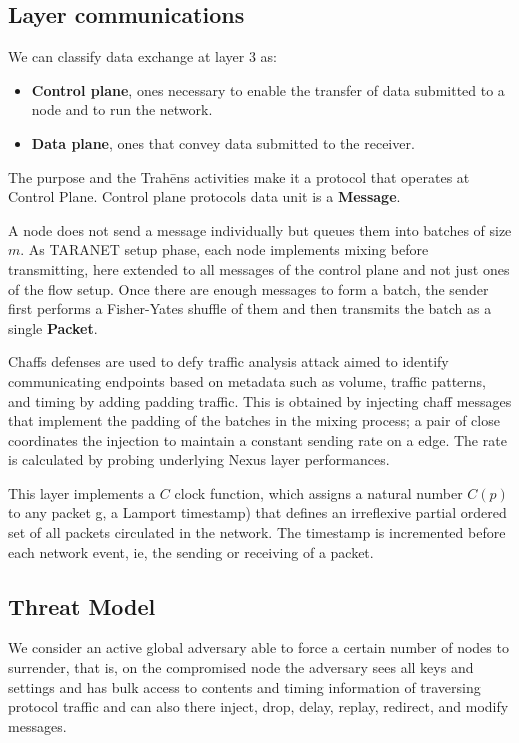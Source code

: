 \documentclass[12pt,oneside]{wlscirep}
\newcommand{\ProtoName}{Trah\={e}ns }
\begin{document}
\subsection{Layer communications}
We can classify data exchange at layer 3 as: 
\begin{itemize}
\item \textbf{Control plane}, ones necessary to enable the transfer of data submitted to a node and to run the network.
\item \textbf{Data plane}, ones that convey data submitted to the receiver. 
\end{itemize}\par
The purpose and the \ProtoName activities make it a protocol that operates at Control Plane. Control plane protocols data unit is a \textbf{Message}. \par
A node does not send a message individually but queues them into batches of size $m$. As TARANET\cite{chen_taranet:_2018} setup phase, each node implements mixing before transmitting, here extended to all messages of the control plane and not just ones of the flow setup. Once there are enough messages to form a batch, the sender first performs a Fisher-Yates shuffle of them and then transmits the batch as a single \textbf{Packet}. \par 
Chaffs defenses are used to defy traffic analysis attack aimed to identify communicating endpoints based on metadata such as volume, traffic patterns, and timing by adding padding traffic. This is obtained by injecting chaff messages that implement the padding of the batches in the mixing process; a pair of close coordinates the injection to maintain a constant sending rate on a edge. The rate is calculated by probing underlying Nexus layer performances. \par 
This layer implements a $C$ clock function, which assigns a natural number $C(p)$ to any packet g, a Lamport timestamp\cite{Lamport:1978:TCO:359545.359563}) that defines an irreflexive partial ordered set of all packets circulated in the network. The timestamp is incremented before each network event, ie, the sending or receiving of a packet.\par


\subsection{Threat Model}
We consider an active global adversary able to force a certain number of nodes to surrender, that is, on the compromised node the adversary sees all keys and settings and has bulk access to contents and timing information of traversing protocol traffic and can also there inject, drop, delay, replay, redirect, and modify messages. 
\end{document}

